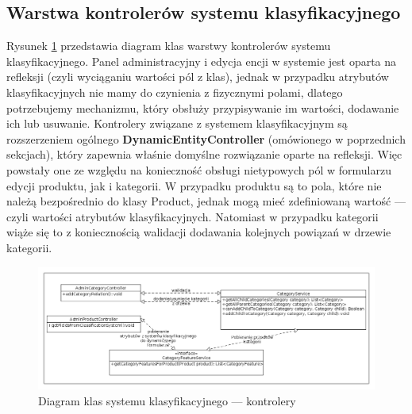 \subsection{Warstwa kontrolerów systemu klasyfikacyjnego}
Rysunek \ref{klasy_kontrolery_sysKlas} przedstawia diagram klas warstwy kontrolerów systemu klasyfikacyjnego. Panel administracyjny i edycja encji w systemie jest oparta na refleksji (czyli wyciąganiu wartości pól z klas), jednak w przypadku atrybutów klasyfikacyjnych nie mamy do czynienia z fizycznymi polami, dlatego potrzebujemy mechanizmu, który obsłuży przypisywanie im wartości, dodawanie ich lub usuwanie. Kontrolery związane z systemem klasyfikacyjnym są rozszerzeniem ogólnego \textbf{DynamicEntityController} (omówionego w poprzednich sekcjach), który zapewnia właśnie domyślne rozwiązanie oparte na refleksji. Więc powstały one ze względu na konieczność obsługi nietypowych pól w formularzu edycji produktu, jak i kategorii. W przypadku produktu są to pola, które nie należą bezpośrednio do klasy Product, jednak mogą mieć zdefiniowaną wartość — czyli wartości atrybutów klasyfikacyjnych. Natomiast w przypadku kategorii wiąże się to z koniecznością walidacji dodawania kolejnych powiązań w drzewie kategorii. 
\begin{figure}
	\begin{center}
		\includegraphics[scale=0.4]{klasy_kontrolery_sysKlas.png}
	\end{center}
	\caption{{\color{black}Diagram klas systemu klasyfikacyjnego — kontrolery}} \label{klasy_kontrolery_sysKlas}
\end{figure}

